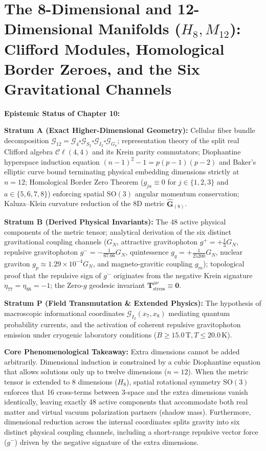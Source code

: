 \documentclass[
    12pt,
    a4paper,
    headings=normal,
    twoside=false,
    open=any,
    parskip=half
]{scrbook}
\begin{document}
\chapter{The 8-Dimensional and 12-Dimensional Manifolds ($H_8, M_{12}$): Clifford Modules, Homological Border Zeroes, and the Six Gravitational Channels}
\label{chap:ch10_expanded}

\begin{firewallbox}
\textbf{Epistemic Status of Chapter 10:}\par\smallskip\noindent
\textbf{Stratum A (Exact Higher-Dimensional Geometry):} Cellular fiber bundle decomposition $\mathcal{G}_{12} = \mathcal{G}_4 \square \mathcal{G}_{S_2} \square \mathcal{G}_{I_2} \square \mathcal{G}_{G_4}$; representation theory of the split real Clifford algebra $\mathcal{C}\ell(4,4)$ and its Krein parity commutators; Diophantine hyperspace induction equation $(n-1)^2 - 1 = p(p-1)(p-2)$ and Baker's elliptic curve bound terminating physical embedding dimensions strictly at $n = 12$; Homological Border Zero Theorem ($g_{ja} \equiv 0$ for $j \in \{1,2,3\}$ and $a \in \{5,6,7,8\}$) enforcing spatial $\mathrm{SO}(3)$ angular momentum conservation; Kaluza--Klein curvature reduction of the 8D metric $\hat{\mathbf{G}}_{(8)}$.\par\smallskip\noindent
\textbf{Stratum B (Derived Physical Invariants):} The 48 active physical components of the metric tensor; analytical derivation of the six distinct gravitational coupling channels ($G_N$, attractive gravitophoton $g^+ = +\frac{1}{3}G_N$, repulsive gravitophoton $g^- = -\frac{1}{67.66}G_N$, quintessence $g_q = +\frac{1}{25200}G_N$, nuclear graviton $g_p \approx 1.29 \times 10^{-4}G_N$, and magneto-gravitic coupling $g_m$); topological proof that the repulsive sign of $g^-$ originates from the negative Krein signature $\eta_{77} = \eta_{88} = -1$; the Zero-$g$ geodesic invariant $\mathbf{T}_{\text{stress}}^{\mu\nu} \equiv \mathbf{0}$.\par\smallskip\noindent
\textbf{Stratum P (Field Transmutation \& Extended Physics):} The hypothesis of macroscopic informational coordinates $\mathcal{G}_{I_2}(x_7, x_8)$ mediating quantum probability currents, and the activation of coherent repulsive gravitophoton emission under cryogenic laboratory conditions ($B \ge 15.0\,\text{T}, T \le 20.0\,\text{K}$).\par\smallskip\noindent
\textbf{Core Phenomenological Takeaway:} Extra dimensions cannot be added arbitrarily. Dimensional induction is constrained by a cubic Diophantine equation that allows solutions only up to twelve dimensions ($n = 12$). When the metric tensor is extended to 8 dimensions ($H_8$), spatial rotational symmetry $\mathrm{SO}(3)$ enforces that 16 cross-terms between 3-space and the extra dimensions vanish identically, leaving exactly 48 active components that accommodate both real matter and virtual vacuum polarization partners (shadow mass). Furthermore, dimensional reduction across the internal coordinates splits gravity into six distinct physical coupling channels, including a short-range repulsive vector force ($g^-$) driven by the negative signature of the extra dimensions.
\end{firewallbox}
\end{document}
